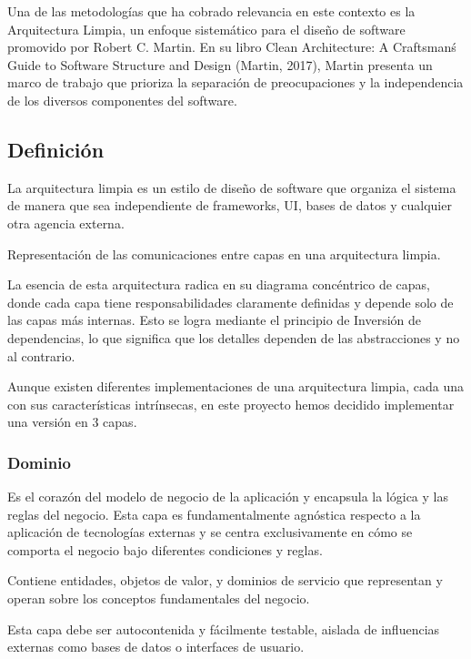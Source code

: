Una de las metodologías que ha cobrado relevancia en este contexto es la Arquitectura Limpia,
un enfoque sistemático para el diseño de software promovido por
Robert C. Martin.
En su libro Clean Architecture: A Craftsman\'
s Guide to Software Structure and Design (Martin, 2017), Martin presenta un marco de trabajo que prioriza la separación
de preocupaciones y la independencia de los diversos componentes del software.

\subsection{Definición}
La arquitectura limpia es un estilo de diseño de software que
organiza el sistema de manera que sea independiente de frameworks, UI, bases de datos y cualquier otra agencia externa.


Representación de las comunicaciones entre capas en una arquitectura limpia.

La esencia de esta arquitectura radica en su diagrama concéntrico de capas, donde cada capa tiene responsabilidades
claramente definidas y depende solo de las capas más internas.
Esto se logra mediante el principio de Inversión de dependencias, lo que significa que los detalles dependen de las
abstracciones y no al contrario.

Aunque existen diferentes implementaciones de una arquitectura limpia, cada una con sus características intrínsecas, en
este proyecto hemos decidido implementar una versión en 3 capas.

\subsubsection*{Dominio}
Es el corazón del modelo de negocio de la aplicación y encapsula la
lógica y las reglas del negocio. Esta capa es fundamentalmente
agnóstica respecto a la aplicación de tecnologías externas y se
centra exclusivamente en cómo se comporta el negocio bajo diferentes condiciones y reglas.

Contiene entidades, objetos de valor, y dominios de servicio que representan y operan sobre los
conceptos fundamentales del negocio.

Esta capa debe ser autocontenida y fácilmente testable, aislada de influencias externas como bases de
datos o interfaces de usuario.

